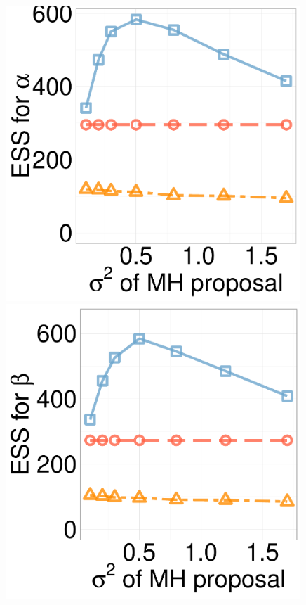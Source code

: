 \begin{figure}[H]
\begin{minipage}[hp]{0.24\linewidth}
	\end{minipage}
  \centering
  \begin{minipage}[!hp]{0.24\linewidth}
  \centering
    \includegraphics [width=0.99\textwidth, angle=0]{figs/ess/Q_D3alpha_k2.pdf}
\end{minipage}
  \begin{minipage}[hp]{0.24\linewidth}
  \centering
    \includegraphics [width=0.99\textwidth, angle=0]{figs/ess/Q_D3beta_k2.pdf}

\end{minipage}
\end{figure}
